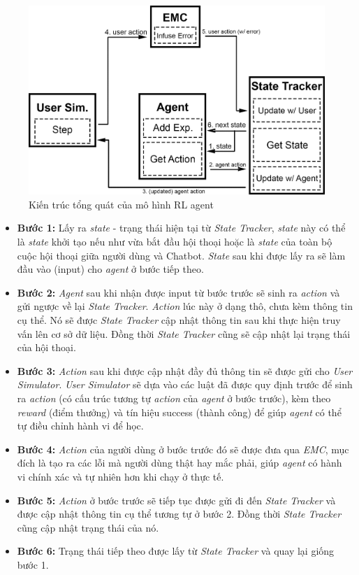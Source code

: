 \begin{figure}[ht]
    \centering
    \includegraphics[width=1\textwidth]{thesis/chatbot/congtrinh/img/train_refer.png}
    \caption{Kiến trúc tổng quát của mô hình RL agent}
    \label{fig:trainrefer}
\end{figure}

\begin{itemize}
    \item \textbf{Bước 1:} Lấy ra \textit{state} - trạng thái hiện tại từ
    \textit{State Tracker}, \textit{state} này có thể là \textit{state}
    khởi tạo nếu như vừa bắt đầu hội thoại hoặc là \textit{state} của
    toàn bộ cuộc hội thoại giữa người dùng và Chatbot. \textit{State}
    sau khi được lấy ra sẽ làm đầu vào (input) cho \textit{agent} ở
    bước tiếp theo.
    \item \textbf{Bước 2:} \textit{Agent} sau khi nhận được input từ
    bước trước sẽ sinh ra \textit{action} và gửi ngược về lại
    \textit{State Tracker}. \textit{Action} lúc này ở dạng thô, chưa
    kèm thông tin cụ thể. Nó sẽ được \textit{State Tracker} cập nhật
    thông tin sau khi thực hiện truy vấn lên cơ sở dữ liệu. Đồng thời
    \textit{State Tracker} cũng sẽ cập nhật lại trạng thái của hội thoại.
    \item \textbf{Bước 3:} \textit{Action} sau khi được cập nhật
    đầy đủ thông tin sẽ được gửi cho \textit{User Simulator}.
    \textit{User Simulator} sẽ dựa vào các luật đã được quy định trước
    để sinh ra \textit{action} (có cấu trúc tương tự \textit{action}
    của \textit{agent} ở bước trước), kèm theo \textit{reward}
    (điểm thưởng) và tín hiệu success (thành công) để giúp
    \textit{agent} có thể tự điều chỉnh hành vi để học.
    \item \textbf{Bước 4:} \textit{Action} của người dùng ở bước
    trước đó sẽ được đưa qua \textit{EMC}, mục đích là tạo ra các lỗi
    mà người dùng thật hay mắc phải, giúp \textit{agent} có hành vi
    chính xác và tự nhiên hơn khi chạy ở thực tế.
    \item \textbf{Bước 5:} \textit{Action} ở bước trước sẽ tiếp tục
    được gửi đi đến \textit{State Tracker} và được cập nhật thông tin
    cụ thể tương tự ở bước 2. Đồng thời \textit{State Tracker} cũng
    cập nhật trạng thái của nó.
    \item \textbf{Bước 6:} Trạng thái tiếp theo được lấy từ
    \textit{State Tracker} và quay lại giống bước 1.
\end{itemize}

